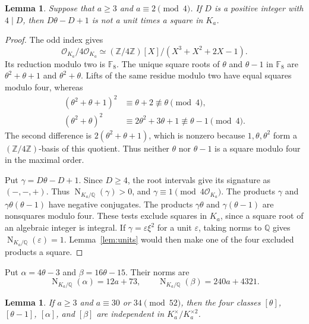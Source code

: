 \documentclass[draft]{publmathdeb}
\newtheorem{lemma}[theorem]{Lemma}
\theoremstyle{remark}
\numberwithin{equation}{section}
\newcommand{\Q}{\mathbb Q}
\newcommand{\Z}{\mathbb Z}
\newcommand{\F}{\mathbb F}
\DeclareMathOperator{\Nm}{N}
\begin{document}
\begin{lemma}\label{lem:obstruction}
  Suppose that $a\geq3$ and $a\equiv2\pmod4$. If $D$ is a positive integer with $4\mid D$, then $D\theta-D+1$ is not a unit times a square in $K_a$.
\end{lemma}

\begin{proof}
  The odd index gives
  \[
    \mathcal O_{K_a}/4\mathcal O_{K_a}\simeq
    (\Z/4\Z)[X]/(X^3+X^2+2X-1).
  \]
  Its reduction modulo two is $\F_8$. The unique square roots of $\theta$ and $\theta-1$ in $\F_8$ are $\theta^2+\theta+1$ and $\theta^2+\theta$. Lifts of the same residue modulo two have equal squares modulo four, whereas
  \begin{align*}
    (\theta^2+\theta+1)^2 & \equiv\theta+2\not\equiv\theta\pmod4,              \\
    (\theta^2+\theta)^2   & \equiv2\theta^2+3\theta+1\not\equiv\theta-1\pmod4.
  \end{align*}
  The second difference is $2(\theta^2+\theta+1)$, which is nonzero because $1,\theta,\theta^2$ form a $(\Z/4\Z)$-basis of this quotient. Thus neither $\theta$ nor $\theta-1$ is a square modulo four in the maximal order.

  Put $\gamma=D\theta-D+1$. Since $D\geq4$, the root intervals give its signature as $(-,-,+)$. Thus $\Nm_{K_a/\Q}(\gamma)>0$, and $\gamma\equiv1\pmod{4\mathcal O_{K_a}}$. The products $\gamma$ and $\gamma\theta(\theta-1)$ have negative conjugates. The products $\gamma\theta$ and $\gamma(\theta-1)$ are nonsquares modulo four. These tests exclude squares in $K_a$, since a square root of an algebraic integer is integral. If $\gamma=\varepsilon\xi^2$ for a unit $\varepsilon$, taking norms to $\Q$ gives $\Nm_{K_a/\Q}(\varepsilon)=1$. Lemma~\ref{lem:units} would then make one of the four excluded products a square.
\end{proof}

Put $\alpha=4\theta-3$ and $\beta=16\theta-15$. Their norms are
\begin{equation}\label{eq:alpha-beta}
  \Nm_{K_a/\Q}(\alpha)=12a+73,\qquad \Nm_{K_a/\Q}(\beta)=240a+4321.
\end{equation}

\begin{lemma}\label{lem:four-classes}
  If $a\geq3$ and $a\equiv30$ or $34\pmod{52}$, then the four classes $[\theta]$, $[\theta-1]$, $[\alpha]$, and $[\beta]$ are independent in $K_a^\times/K_a^{\times2}$.
\end{lemma}
\end{document}
